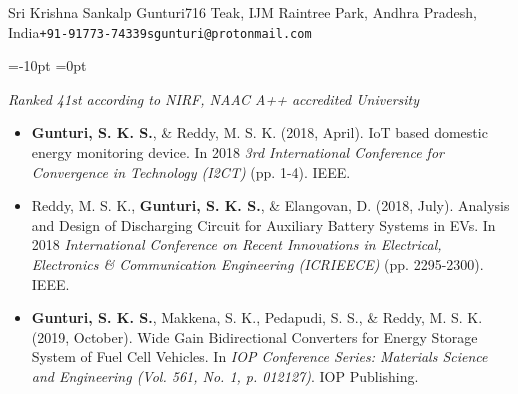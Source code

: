 \documentclass{gradstudentresume}
\begin{document}
\begin{info}{Sri Krishna Sankalp Gunturi}{716 Teak, IJM Raintree Park, Andhra Pradesh, India}{\texttt{+91-91773-74339}}{\texttt{sgunturi@protonmail.com}}
\end{info}


\begin{window}
	\centering
	\hbox
	{}
	=-10pt %
	=0pt
\end{window}

\vspace{5mm}

\textit{Ranked 41st according to NIRF, NAAC A++ accredited University}
\medspace 

\medspace 

\largespace

\begin{itemize}
	\item \textbf{Gunturi, S. K. S.}, \& Reddy, M. S. K. (2018, April). IoT based domestic energy monitoring device. In 2018 \textit{3rd International Conference for Convergence in Technology (I2CT)} (pp. 1-4). IEEE.
	
	\item Reddy, M. S. K., \textbf{Gunturi, S. K. S.}, \& Elangovan, D. (2018, July). Analysis and Design of Discharging Circuit for Auxiliary Battery Systems in EVs. In 2018 \textit{International Conference on Recent Innovations in Electrical, Electronics \& Communication Engineering (ICRIEECE)} (pp. 2295-2300). IEEE.
	
	\item{ \textbf{Gunturi, S. K. S.}, Makkena, S. K., Pedapudi, S. S., \& Reddy, M. S. K. (2019, October). Wide Gain Bidirectional Converters for Energy Storage System of Fuel Cell Vehicles. In \textit{IOP Conference Series: Materials Science and Engineering (Vol. 561, No. 1, p. 012127)}. IOP Publishing.}
\end{itemize}
\end{document}

